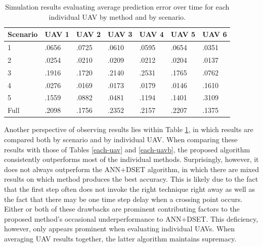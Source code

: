 \documentclass[12pt]{uthesis-v12}  %
\begin{document}
\begin{table}[!t]
\caption{Simulation results evaluating average prediction error over time for each individual UAV by method and by scenario.}
\renewcommand{\arraystretch}{1.3}
\centering
{\begin{tabular}{*{7}{l}}
\toprule
Scenario & UAV 1 & UAV 2 & UAV 3 & UAV 4 & UAV 5 & UAV 6 \\ \midrule
1 & .0656 & .0725 & .0610 & .0595 & .0654 & .0351 \\
2 & .0254 & .0210 & .0209 & .0212 & .0204 & .0137 \\
3 & .1916 & .1720 & .2140 & .2531 & .1765 & .0762 \\
4 & .0276 & .0169 & .0173 & .0179 & .0146 & .1610 \\
5 & .1559 & .0882 & .0481 & .1194 & .1401 & .3109 \\
Full & .2098 & .1756 & .2352 & .2157 & .2207 & .1375 \\
\bottomrule
\end{tabular}}

\label{each-uav2}
\end{table}

Another perspective of observing results lies within Table \ref{each-uav2}, in which results are compared both by scenario and by individual UAV. When comparing these results with those of Tables \ref{each-uav} and \ref{each-uavb}, the proposed algorithm consistently outperforms most of the individual methods. Surprisingly, however, it does not always outperform the ANN+DSET algorithm, in which there are mixed results on which method produces the best accuracy. This is likely due to the fact that the first step often does not invoke the right technique right away as well as the fact that there may be one time step delay when a crossing point occurs. Either or both of these drawbacks are prominent contributing factors to the proposed method's occasional underperformance to ANN+DSET. This deficiency, however, only appears prominent when evaluating individual UAVs. When averaging UAV results together, the latter algorithm maintains supremacy.
\end{document}
